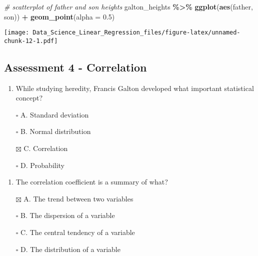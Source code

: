 \documentclass[
]{article}
\newenvironment{Shaded}{\begin{snugshade}}{\end{snugshade}}
\newcommand{\CommentTok}[1]{\textcolor[rgb]{0.56,0.35,0.01}{\textit{#1}}}
\newcommand{\DataTypeTok}[1]{\textcolor[rgb]{0.13,0.29,0.53}{#1}}
\newcommand{\FloatTok}[1]{\textcolor[rgb]{0.00,0.00,0.81}{#1}}
\newcommand{\KeywordTok}[1]{\textcolor[rgb]{0.13,0.29,0.53}{\textbf{#1}}}
\newcommand{\NormalTok}[1]{#1}
\newcommand{\OperatorTok}[1]{\textcolor[rgb]{0.81,0.36,0.00}{\textbf{#1}}}
\newcommand{\StringTok}[1]{\textcolor[rgb]{0.31,0.60,0.02}{#1}}
\providecommand{\tightlist}{%
  \setlength{\itemsep}{0pt}\setlength{\parskip}{0pt}}
\begin{document}
\begin{Shaded}
\begin{Highlighting}[]
\CommentTok{\# scatterplot of father and son heights}
\NormalTok{galton\_heights }\OperatorTok{\%\textgreater{}\%}
\StringTok{    }\KeywordTok{ggplot}\NormalTok{(}\KeywordTok{aes}\NormalTok{(father, son)) }\OperatorTok{+}
\StringTok{    }\KeywordTok{geom\_point}\NormalTok{(}\DataTypeTok{alpha =} \FloatTok{0.5}\NormalTok{)}
\end{Highlighting}
\end{Shaded}

\texttt{[image: Data\_Science\_Linear\_Regression\_files/figure-latex/unnamed-chunk-12-1.pdf]}

\hypertarget{assessment-4---correlation}{%
\subsection{Assessment 4 -
Correlation}\label{assessment-4---correlation}}

\begin{enumerate}
\def\labelenumi{\arabic{enumi}.}
\tightlist
\item
  While studying heredity, Francis Galton developed what important
  statistical concept?
\end{enumerate}

\begin{itemize}
\tightlist
\item[$\square$]
  A. Standard deviation
\item[$\square$]
  B. Normal distribution
\item[$\boxtimes$]
  C. Correlation
\item[$\square$]
  D. Probability
\end{itemize}

\begin{enumerate}
\def\labelenumi{\arabic{enumi}.}
\setcounter{enumi}{1}
\tightlist
\item
  The correlation coefficient is a summary of what?
\end{enumerate}

\begin{itemize}
\tightlist
\item[$\boxtimes$]
  A. The trend between two variables
\item[$\square$]
  B. The dispersion of a variable
\item[$\square$]
  C. The central tendency of a variable
\item[$\square$]
  D. The distribution of a variable
\end{itemize}
\end{document}
